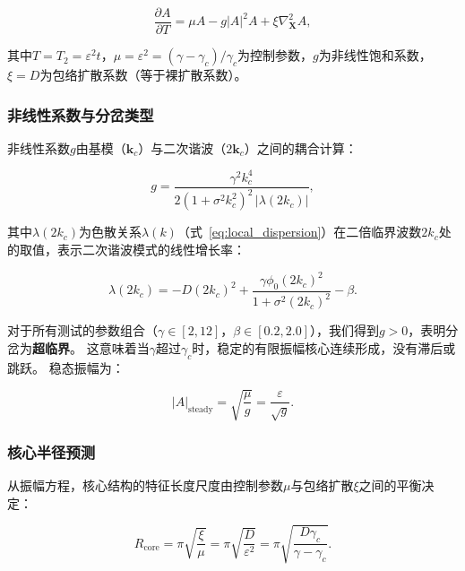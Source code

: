 \documentclass[sn-nature,pdflatex]{sn-jnl}
\begin{document}
\begin{equation}
\label{eq:gl_equation}
\frac{\partial A}{\partial T} = \mu A - g |A|^2 A + \xi \nabla_{\mathbf{X}}^2 A,
\end{equation}

其中$T = T_2 = \varepsilon^2 t$，$\mu = \varepsilon^2 = (\gamma - \gamma_c)/\gamma_c$为控制参数，$g$为非线性饱和系数，$\xi = D$为包络扩散系数（等于裸扩散系数）。

\subsubsection{非线性系数与分岔类型}

非线性系数$g$由基模（$\mathbf{k}_c$）与二次谐波（$2\mathbf{k}_c$）之间的耦合计算：

\begin{equation}
\label{eq:g_coefficient}
g = \frac{\gamma^2 k_c^4}{2 (1 + \sigma^2 k_c^2)^2 \, |\lambda(2k_c)|},
\end{equation}

其中$\lambda(2k_c)$为色散关系$\lambda(k)$（式~\ref{eq:local_dispersion}）在二倍临界波数$2k_c$处的取值，表示二次谐波模式的线性增长率：

\begin{equation}
\lambda(2k_c) = -D(2k_c)^2 + \frac{\gamma \phi_0 (2k_c)^2}{1 + \sigma^2 (2k_c)^2} - \beta.
\end{equation}

对于所有测试的参数组合（$\gamma \in [2, 12]$，$\beta \in [0.2, 2.0]$），我们得到$g > 0$，表明分岔为\textbf{超临界}。
这意味着当$\gamma$超过$\gamma_c$时，稳定的有限振幅核心连续形成，没有滞后或跳跃。
稳态振幅为：

\begin{equation}
|A|_{\text{steady}} = \sqrt{\frac{\mu}{g}} = \frac{\varepsilon}{\sqrt{g}}.
\end{equation}

\subsubsection{核心半径预测}

从振幅方程，核心结构的特征长度尺度由控制参数$\mu$与包络扩散$\xi$之间的平衡决定：

\begin{equation}
\label{eq:core_radius}
R_{\text{core}} = \pi \sqrt{\frac{\xi}{\mu}} = \pi \sqrt{\frac{D}{\varepsilon^2}} = \pi \sqrt{\frac{D \gamma_c}{\gamma - \gamma_c}}.
\end{equation}
\end{document}
